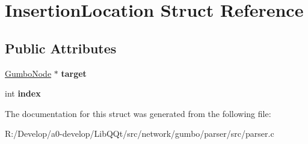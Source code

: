 \hypertarget{struct_insertion_location}{}\section{Insertion\+Location Struct Reference}
\label{struct_insertion_location}
\subsection*{Public Attributes}
\begin{DoxyCompactItemize}
\item 
\mbox{\label{struct_insertion_location_a13a78f0d89c7b3560d1b0b7d1a8ceacb}} 
\mbox{\hyperlink{gumbo_8h_a5f67d8397fda8fb7c90cc27f14ac4e7d}{Gumbo\+Node}} $\ast$ {\bfseries target}
\item 
\mbox{\label{struct_insertion_location_adfc96055f9e8b509fa372df3b2608c56}} 
int {\bfseries index}
\end{DoxyCompactItemize}


The documentation for this struct was generated from the following file\+:\begin{DoxyCompactItemize}
\item 
R\+:/\+Develop/a0-\/develop/\+Lib\+Q\+Qt/src/network/gumbo/parser/src/parser.\+c\end{DoxyCompactItemize}
